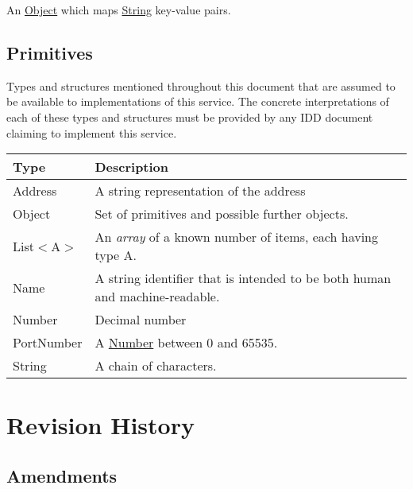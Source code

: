 \documentclass[a4paper]{arrowhead}
\newcommand{\pdef}[1]{{\textcolor{ArrowheadGrey}{#1\label{sec:model:primitives:#1}\label{sec:model:primitives:#1s}\label{sec:model:primitives:#1es}}}}
\newcommand{\pref}[1]{{\textcolor{ArrowheadGrey}{\hyperref[sec:model:primitives:#1]{#1}}}}
\begin{document}
\label{sec:model:Metadata}

An \pref{Object} which maps \pref{String} key-value pairs.

\clearpage

\subsection{Primitives}
\label{sec:model:primitives}

Types and structures mentioned throughout this document that are assumed to be available to implementations of this service.
The concrete interpretations of each of these types and structures must be provided by any IDD document claiming to implement this service.


\begin{table}[ht!]
\begin{tabularx}{\textwidth}{| p{3cm} | X |} \hline
\rowcolor{gray!33} Type & Description \\ \hline
\pdef{Address}          & A string representation of the address \\ \hline
\pdef{Object}           & Set of primitives and possible further objects. \\ \hline
\pdef{List}$<$A$>$      & An \textit{array} of a known number of items, each having type A. \\ \hline
\pdef{Name}             & A string identifier that is intended to be both human and machine-readable. \\ \hline
\pdef{Number}           & Decimal number \\ \hline
\pdef{PortNumber}       & A \pref{Number} between 0 and 65535. \\ \hline
\pdef{String}           & A chain of characters. \\ \hline
\end{tabularx}
\end{table}

\newpage




\newpage

\section{Revision History}
\subsection{Amendments}
\end{document}

